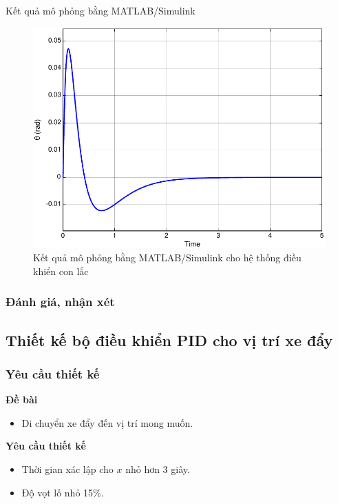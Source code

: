 \documentclass[12pt,a4paper]{article}
\begin{document}
Kết quả mô phỏng bằng MATLAB/Simulink
\begin{figure}[ht]
    \centering
    \includegraphics[width=\linewidth]{MATLAB_5.pdf}
    \caption{Kết quả mô phỏng bằng MATLAB/Simulink cho hệ thống điều khiển con lắc}
\end{figure}

\subsubsection{Đánh giá, nhận xét}


\subsection{Thiết kế bộ điều khiển PID cho vị trí xe đẩy}
\subsubsection{Yêu cầu thiết kế}
\begin{minipage}[t]{0.3\linewidth}
    \textbf{Đề bài}
\end{minipage}\begin{minipage}[t]{0.6\linewidth}
    \begin{itemize}
        \item  Di chuyển xe đẩy đến vị trí mong muốn.
    \end{itemize}
\end{minipage}

\vspace{\baselineskip}

\begin{minipage}[t]{0.3\linewidth}
    \textbf{Yêu cầu thiết kế}
\end{minipage}\begin{minipage}[t]{0.6\linewidth}
    \begin{itemize}[noitemsep,topsep=0pt]
        \item Thời gian xác lập cho $x$ nhỏ hơn 3 giây.
        \item Độ vọt lố nhỏ 15\%.
    \end{itemize}
\end{minipage}
\end{document}
